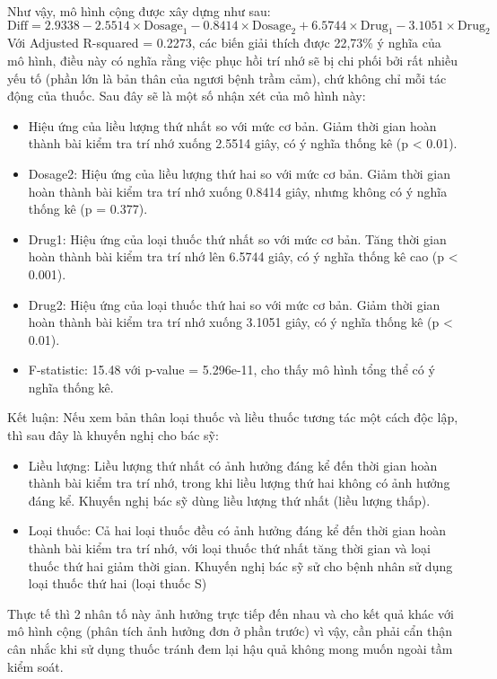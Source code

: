 Như vậy, mô hình cộng được xây dựng như sau:
\[
\text{Diff} = 2.9338 - 2.5514 \times \text{Dosage}_1 - 0.8414 \times \text{Dosage}_2 + 6.5744 \times \text{Drug}_1 - 3.1051 \times \text{Drug}_2
\]
 Với Adjusted R-squared = 0.2273, các biến giải thích được 22,73\% ý nghĩa của mô hình, điều này có nghĩa rằng việc phục hồi trí nhớ sẽ bị chi phối bởi rất nhiều yếu tố (phần lớn là bản thân của ngươi bệnh trầm cảm), chứ không chỉ mỗi tác động của thuốc. Sau đây sẽ là một số nhận xét của mô hình này:
 \begin{itemize}
     \item Hiệu ứng của liều lượng thứ nhất so với mức cơ bản. Giảm thời gian hoàn thành bài kiểm tra trí nhớ xuống 2.5514 giây, có ý nghĩa thống kê (p < 0.01).
     \item Dosage2: Hiệu ứng của liều lượng thứ hai so với mức cơ bản. Giảm thời gian hoàn thành bài kiểm tra trí nhớ xuống 0.8414 giây, nhưng không có ý nghĩa thống kê (p = 0.377).
     \item Drug1: Hiệu ứng của loại thuốc thứ nhất so với mức cơ bản. Tăng thời gian hoàn thành bài kiểm tra trí nhớ lên 6.5744 giây, có ý nghĩa thống kê cao (p < 0.001).
    \item Drug2: Hiệu ứng của loại thuốc thứ hai so với mức cơ bản. Giảm thời gian hoàn thành bài kiểm tra trí nhớ xuống 3.1051 giây, có ý nghĩa thống kê (p < 0.01).
    \item  F-statistic: 15.48 với p-value = 5.296e-11, cho thấy mô hình tổng thể có ý nghĩa thống kê.
 \end{itemize}
 Kết luận: Nếu xem bản thân loại thuốc và liều thuốc tương tác một cách độc lập, thì sau đây là khuyến nghị cho bác sỹ:
 \begin{itemize}
     \item Liều lượng: Liều lượng thứ nhất có ảnh hưởng đáng kể đến thời gian hoàn thành bài kiểm tra trí nhớ, trong khi liều lượng thứ hai không có ảnh hưởng đáng kể. Khuyến nghị bác sỹ dùng liều lượng thứ nhất (liều lượng thấp). 
     \item Loại thuốc: Cả hai loại thuốc đều có ảnh hưởng đáng kể đến thời gian hoàn thành bài kiểm tra trí nhớ, với loại thuốc thứ nhất tăng thời gian và loại thuốc thứ hai giảm thời gian. Khuyến nghị bác sỹ sử cho bệnh nhân sử dụng loại thuốc thứ hai (loại thuốc S)
 \end{itemize}
 Thực tế thì 2 nhân tố này ảnh hưởng trực tiếp đến nhau và cho kết quả khác với mô hình cộng (phân tích ảnh hưởng đơn ở phần trước) vì vậy, cần phải cẩn thận cân nhắc khi sử dụng thuốc tránh đem lại hậu quả không mong muốn ngoài tầm kiểm soát.


